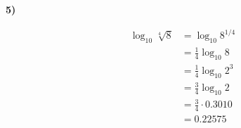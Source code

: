 \documentclass[11pt,a4paper,fleqn]{article}
\begin{document}
\textbf{5)}

\begin{align*}
  \log_{10} \sqrt[4]{8}
    &= \log_{10} 8^{1/4} \\
    &= \frac{1}{4} \log_{10} 8 \\
    &= \frac{1}{4} \log_{10} 2^{3} \\
    &= \frac{3}{4} \log_{10} 2 \\
    &= \frac{3}{4} \cdot 0.3010 \\
    &= 0.22575
\end{align*}
\end{document}
